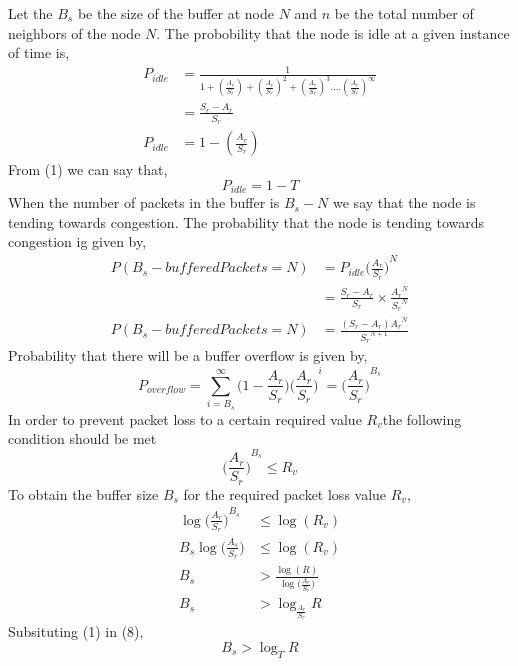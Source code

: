 \documentclass[journal]{IEEEtran}
\begin{document}
Let the $B_s$ be the size of the buffer at node $N$ and $n$ be the total number of neighbors of the node $N$. The probobility that the node is idle at a given instance of time is,
\begin{equation}
\begin{split}
P_{idle} & = \frac{1}{1+(\frac{A_r}{S_r})+{(\frac{A_r}{S_r})}^{2}+{(\frac{A_r}{S_r})}^{3}....{(\frac{A_r}{S_r})}^{\infty}}\\
		 & = \frac{S_r-A_r}{S_r}\\
P_{idle} & = 1-(\frac{A_r}{S_r})
\end{split}
\end{equation}   
From (1) we can say that,
\begin{equation}
P_{idle}=1-T 
\end{equation}
When the number of packets in the buffer is $B_s - N$ we say that the node is tending towards congestion. The probability that the node is tending towards congestion ig given by,
\begin{equation}
\begin{split}
P(B_s - bufferedPackets = N) &=P_{idle}{\Big(\frac{A_r}{S_r}\Big)}^{N}\\
                                               &=\frac{S_r-A_r}{S_r}\times \frac{{A_r}^{N}}{{S_r}^{N}}\\
P(B_s - bufferedPackets = N) &=\frac{(S_r-A_r){A_r}^{N}}{{S_r}^{N+1}}
\end{split}
\end{equation}
Probability that there will be a buffer overflow is given by,
\begin{equation}
P_{overflow}=\sum\limits_{i=B_s}^{\infty}\Big(1-\frac{A_r}{S_r}\Big){\Big(\frac{A_r}{S_r}\Big)}^{i}={\Big(\frac{A_r}{S_r}\Big)}^{B_s}
\end{equation}
In order to prevent packet loss to a certain required value $R_v$the following condition should be met
\begin{equation}
{\Big(\frac{A_r}{S_r}\Big)}^{B_s}\le R_v
\end{equation}
To obtain the buffer size $B_s$ for the required packet loss value $R_v$,
\begin{equation}
\begin{split}
\log{\Big(\frac{A_r}{S_r}\Big)}^{B_s}&\le \log(R_v)\\
B_s \log\Big(\frac{A_s}{S_r}\Big)&\le \log(R_v)\\
B_s &>\frac{\log(R)}{\log\Big(\frac{A_r}{S_r}\Big)}\\
B_s &>\log_\frac{A_r}{S_r}R
\end{split}
\end{equation}
Subsituting (1) in (8),
\begin{equation}
B_s >\log_TR
\end{equation}
\end{document}
